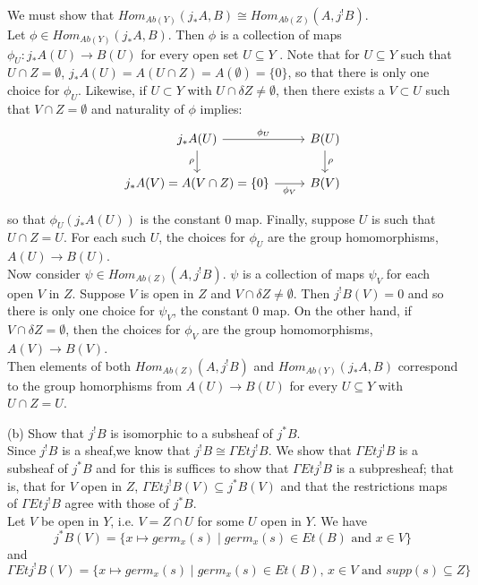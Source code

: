 We must show that $Hom_{Ab(Y)}(j_*A, B) \cong Hom_{Ab(Z)} (A, j^!B)$.\\

Let $\phi \in Hom_{Ab(Y)}(j_*A, B)$. Then $\phi$ is a collection of maps $\phi_U: j_*A(U) \rightarrow B(U)$ for every open set $U \subseteq Y$ . Note that for $U \subseteq Y$ such that $U \cap Z = \emptyset$, $j_*A(U) = A(U \cap Z) = A(\emptyset) = \{0\}$, so that there is only one choice for $\phi_U$. Likewise, if $U \subset Y$ with $U \cap \delta Z \neq \emptyset$, then there exists a $V \subset U$ such that $V \cap Z = \emptyset$ and naturality of $\phi$ implies:
\[
\begin{tikzcd}
 j_*A(U) \arrow[r, "\phi_U"] \arrow[d, "\rho"']
& B(U) \arrow[d, "\rho"] \\
 j_*A(V)= A(V \cap Z) = \{0\} \arrow[r, "\phi_V"']
& B(V)
\end{tikzcd}
\]

so that $\phi_U(j_*A(U))$ is the constant $0$ map. Finally, suppose $U$ is such that $U \cap Z = U$. For each such $U$, the choices for $\phi_U$ are the group homomorphisms, $A(U) \rightarrow B(U)$. \\

Now consider $\psi \in Hom_{Ab(Z)} (A, j^!B)$. $\psi$ is a collection of maps $\psi_V$ for each open $V$ in $Z$. Suppose $V$ is open in $Z$ and $V \cap \delta Z \neq \emptyset$. Then $j^!B(V) = {0}$ and so there is only one choice for $\psi_V$, the constant $0$ map. On the other hand, if $V \cap \delta Z = \emptyset$, then the choices for $\phi_V$ are the group homomorphisms, $A(V) \rightarrow B(V)$.\\

Then elements of both $Hom_{Ab(Z)} (A, j^!B)$ and $Hom_{Ab(Y)}(j_*A, B)$ correspond to the group homorphisms from $A(U) \rightarrow B(U)$ for every $U \subseteq Y$ with $U \cap Z = U$. 


 (b) Show that $j^!B$ is isomorphic to a subsheaf of $j^*B$.\\


Since $j^!B$ is a sheaf,we know that $j^!B \cong \Gamma Et j^!B$. We show that $\Gamma Et j^!B$ is a subsheaf of $j^*B$ and for this is suffices to show that $\Gamma Et j^!B$ is a subpresheaf; that is, that for $V$ open in $Z$, $\Gamma Et j^!B(V) \subseteq j^*B(V)$ and that the restrictions maps of $\Gamma Et j^!B$ agree with those of $j^*B$.\\

Let $V$ be open in $Y$, i.e. $V=Z\cap U$ for some $U$ open in $Y$. We have
\[j^*B(V)=\{x \mapsto germ_x(s) \mid germ_x(s) \in Et(B)\text{ and }x \in V\}\]
and 
\[\Gamma Etj^!B(V)=\{x \mapsto germ_x(s) \mid germ_x(s) \in Et(B)\text{, }x \in V \text{ and } supp(s) \subseteq Z\}\]

